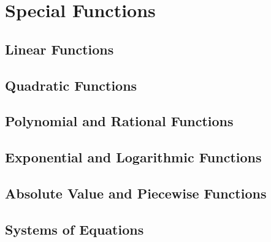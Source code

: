 \chapter{Special Functions}

\section{Linear Functions}

\section{Quadratic Functions}

\section{Polynomial and Rational Functions}

\section{Exponential and Logarithmic Functions}

\section{Absolute Value and Piecewise Functions}

\section{Systems of Equations}

